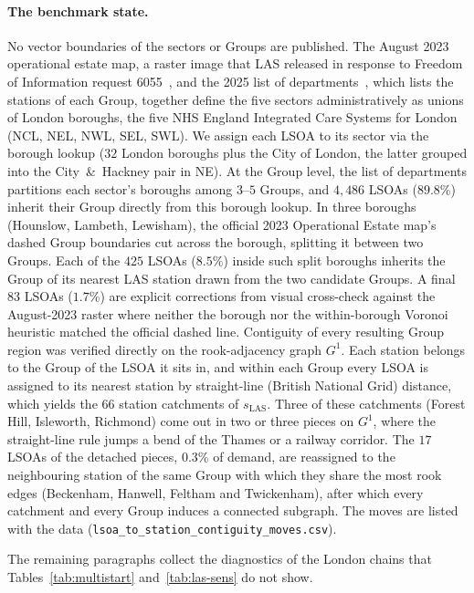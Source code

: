 \documentclass[11pt]{article}
\theoremstyle{definition}
\begin{document}
\paragraph{The benchmark state.}
No vector boundaries of the sectors or Groups are published. The August 2023 operational estate map, a raster image that LAS released in response to Freedom of Information request 6055~\citep{las_estate2023}, and the 2025 list of departments~\citep{las_departments2025}, which lists the stations of each Group, together define
the five sectors administratively as unions of London boroughs, the
five NHS England Integrated Care Systems for London (NCL, NEL, NWL,
SEL, SWL). We assign each LSOA to its sector via the borough lookup
($32$ London boroughs plus the City of London, the latter grouped
into the City~\&~Hackney pair in NE). At the Group level, the list of departments partitions each sector's boroughs among $3$--$5$
Groups, and $4{,}486$ LSOAs ($89.8\%$) inherit their Group directly from this borough lookup. In three boroughs (Hounslow, Lambeth, Lewisham), the official 2023 Operational Estate map's dashed Group boundaries cut across the borough, splitting it between two Groups. Each of the $425$ LSOAs ($8.5\%$) inside such split boroughs inherits the Group of its nearest LAS station drawn from the two candidate Groups. A final $83$ LSOAs ($1.7\%$) are explicit
corrections from visual cross-check against the August-2023 raster
where neither the borough nor the within-borough Voronoi heuristic
matched the official dashed line. Contiguity of every resulting
Group region was verified directly on the rook-adjacency graph
$G^1$. Each station belongs to the Group of the LSOA it sits in, and within each Group every LSOA is assigned to its nearest station by straight-line (British National Grid) distance, which yields the $66$ station catchments of $s_{\mathrm{LAS}}$. Three of these catchments (Forest Hill, Isleworth, Richmond) come out in two or three pieces on $G^1$, where the straight-line rule jumps a bend of the Thames or a railway corridor. The $17$ LSOAs of the detached pieces, $0.3\%$ of demand, are reassigned to the neighbouring station of the same Group with which they share the most rook edges (Beckenham, Hanwell, Feltham and Twickenham), after which every catchment and every Group induces a connected subgraph. The moves are listed with the data (\texttt{lsoa\_to\_station\_contiguity\_moves.csv}).



The remaining paragraphs collect the diagnostics of the London chains that Tables~\ref{tab:multistart} and~\ref{tab:las-sens} do not show.
\end{document}
